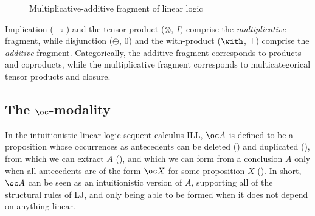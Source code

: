 \begin{figure}
  \caption{Multiplicative-additive fragment of linear logic}
  \label{fig:mall}
\end{figure}

Implication ($\multimap$) and the tensor-product ($\otimes$, $I$) comprise the
\emph{multiplicative} fragment, while disjunction ($\oplus$, $0$) and the
with-product ($\with$, $\top$) comprise the \emph{additive} fragment.
Categorically, the additive fragment corresponds to products and coproducts,
while the multiplicative fragment corresponds to multicategorical tensor
products and closure.

\subsection{The $\oc$-modality}\label{sec:bang-modality}


In the intuitionistic linear logic sequent calculus ILL, $\oc A$ is defined
to be a proposition whose occurrences as antecedents can be deleted
() and duplicated (), from which we can
extract $A$ (), and which we can form from a conclusion
$A$ only when all antecedents are of the form $\oc X$ for some proposition $X$
().
In short, $\oc A$ can be seen as an intuitionistic version of $A$, supporting
all of the structural rules of LJ, and only being able to be formed when it
does not depend on anything linear.

